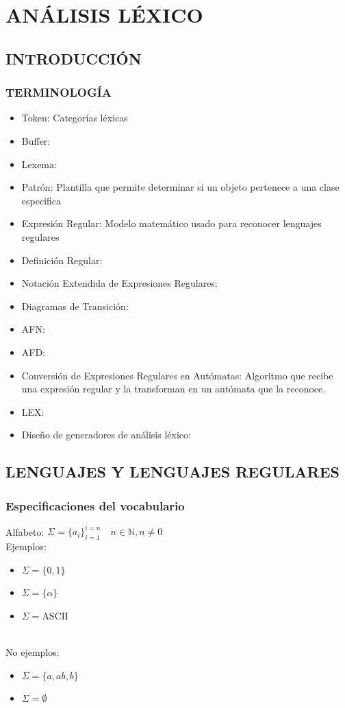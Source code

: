 \chapter{ANÁLISIS LÉXICO}
\section{INTRODUCCIÓN}
\subsection{TERMINOLOGÍA}
\begin{itemize}
    \item Token: Categorías léxicas
    \item Buffer:
    \item Lexema: 
    \item Patrón: Plantilla que permite determinar si un objeto pertenece a una clase especifica
    \item Expresión Regular: Modelo matemático usado para reconocer lenguajes regulares
    \item Definición Regular:
    \item Notación Extendida de Expresiones Regulares: 
    \item Diagramas de Transición:
    \item AFN:
    \item AFD:
    \item Conversión de Expresiones Regulares en Autómatas: Algoritmo que recibe una expresión regular y la transforman en un autómata que la reconoce. 
    \item LEX: 
    \item Diseño de generadores de análisis léxico: 
\end{itemize}


\section{LENGUAJES Y LENGUAJES REGULARES}
\subsection{Especificaciones del vocabulario}
Alfabeto: $\Sigma = \{a_i\}^{i=n}_{i=1} \quad n \in \mathbb{N}, n \neq 0$\\
Ejemplos:
\begin{itemize}
    \item $\Sigma = \{0,1\}$
    \item $\Sigma = \{\alpha\}$
    \item $\Sigma = \text{ASCII}$
\end{itemize}\\
No ejemplos:
\begin{itemize}
    \item $\Sigma = \{a, ab, b\}$
    \item $\Sigma = \emptyset$ 
\end{itemize}

